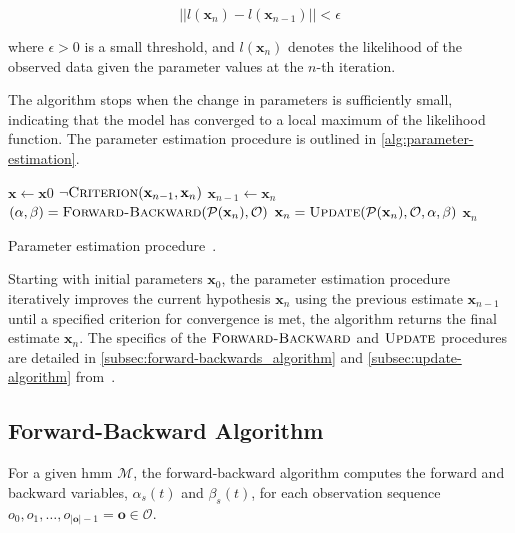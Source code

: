 \begin{equation}
    ||l(\textbf{x}_n) - l(\textbf{x}_{n-1})|| < \epsilon\label{eq:convergence-criterion}
\end{equation}

where $\epsilon > 0$ is a small threshold, and $l(\textbf{x}_n)$ denotes the likelihood of the observed data given the parameter values at the $n$-th iteration.

The algorithm stops when the change in parameters is sufficiently small, indicating that the model has converged to a local maximum of the likelihood function.
The parameter estimation procedure is outlined in \autoref{alg:parameter-estimation}.

\begin{algorithm}[htb!]
    \begin{codebox}
        \li $\mathbf{x} \gets \mathbf{x}0$
        \li \While $\neg\textnormal{\scshape Criterion}(\mathbf{x}_{n-1}, \mathbf{x}_n)$
        \li \Do $\mathbf{x}_{n - 1} \gets \mathbf{x}_n$
        \li $(\alpha, \beta) = \proc{Forward-Backward}(\mathcal{P}(\mathbf{x}_n), \mathcal{O})$
        \li $\mathbf{x}_n = \proc{Update}(\mathcal{P}(\mathbf{x}_n), \mathcal{O}, \alpha, \beta)$ \End
        \li \Return $\mathbf{x}_n$
    \end{codebox}
    \caption{Parameter estimation procedure~\cite{p7}.}
    \label{alg:parameter-estimation}
\end{algorithm}

Starting with initial parameters $\mathbf{x}_0$, the parameter estimation procedure iteratively improves the current hypothesis $\mathbf{x}_n$ using the previous estimate $\mathbf{x}_{n-1}$ until a specified criterion for convergence is met, the algorithm returns the final estimate $\mathbf{x}_n$.
The specifics of the $\textnormal{\scshape Forward-Backward}$ and $\textnormal{\scshape Update}$ procedures are detailed in \autoref{subsec:forward-backwards_algorithm} and \autoref{subsec:update-algorithm} from~\cite{levinson1983introduction}.

\subsection{Forward-Backward Algorithm}\label{subsec:forward-backwards_algorithm}
For a given \gls{hmm} $\mathcal{M}$, the forward-backward algorithm computes the forward and backward variables, $\alpha_s(t)$ and $\beta_s(t)$, for each observation sequence $o_0, o_1, \dots, o_{|\mathbf{o}|-1} = \mathbf{o} \in \mathcal{O}$.

